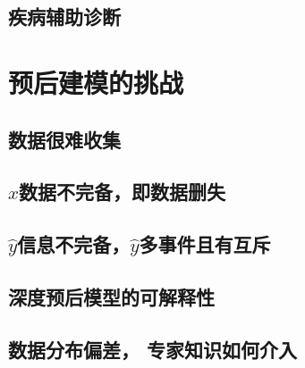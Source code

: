 \documentclass{article}
\begin{document}
    \subsection{疾病辅助诊断}
    

\section{预后建模的挑战}
    \subsection{数据很难收集}

    \subsection{$x$数据不完备，即数据删失}

    \subsection{$\hat{y} $信息不完备，$\hat{y} $多事件且有互斥}

    \subsection{深度预后模型的可解释性}

    \subsection{数据分布偏差， 专家知识如何介入}

    \label{EndBody}        


\newpage
\pagestyle{empty}



\end{document}
